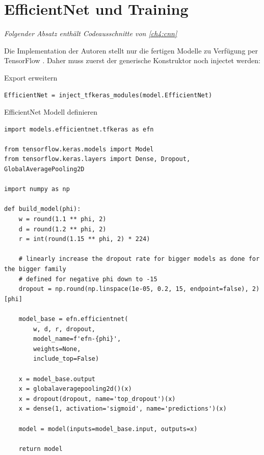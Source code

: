 \section{EfficientNet und Training} \label{ap:efn_train}
\begin{flushright}{\slshape
	Folgender Absatz enthält Codeausschnitte von \autoref{ch4:cnn}} \\ \medskip
\end{flushright}

Die Implementation der Autoren stellt nur die fertigen Modelle zu Verfügung per TensorFlow \cite{yakubovskiy_qubvel/efficientnet_2019}.
Daher muss zuerst der generische Konstruktor noch injectet werden:
\begin{code} \label{code:efn_export}
\caption{ Export erweitern }
\begin{verbatim}
EfficientNet = inject_tfkeras_modules(model.EfficientNet)
\end{verbatim}
\end{code}


\begin{code} \label{code:efn}
\caption{EfficientNet Modell definieren }
\begin{verbatim}
import models.efficientnet.tfkeras as efn

from tensorflow.keras.models import Model
from tensorflow.keras.layers import Dense, Dropout, GlobalAveragePooling2D

import numpy as np

def build_model(phi):
    w = round(1.1 ** phi, 2)
    d = round(1.2 ** phi, 2)
	r = int(round(1.15 ** phi, 2) * 224)

	# linearly increase the dropout rate for bigger models as done for the bigger family
	# defined for negative phi down to -15
    dropout = np.round(np.linspace(1e-05, 0.2, 15, endpoint=false), 2)[phi]

    model_base = efn.efficientnet(
        w, d, r, dropout,
        model_name=f'efn-{phi}',
        weights=None,
        include_top=False)

    x = model_base.output
    x = globalaveragepooling2d()(x)
    x = dropout(dropout, name='top_dropout')(x)
    x = dense(1, activation='sigmoid', name='predictions')(x)

    model = model(inputs=model_base.input, outputs=x)

    return model
\end{verbatim}
\end{code}

